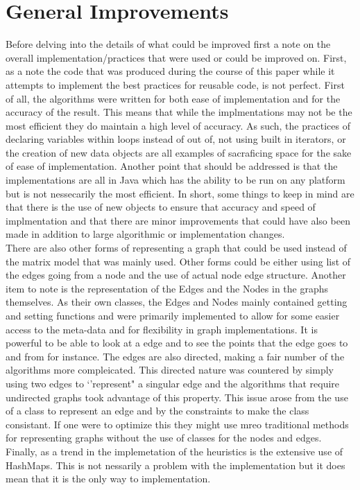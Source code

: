 \documentclass[midd]{thesis}
\newcommand{\tab}{\hspace*{2em}}
\begin{document}
\section{General Improvements}
\tab Before delving into the details of what could be improved first a note on the overall implementation/practices that were used or could be improved on. First, as a note the code that was produced during the course of this paper while it attempts to implement the best practices for reusable code, is not perfect. First of all, the algorithms were written for both ease of implementation and for the accuracy of the result. This means that while the implmentations may not be the most efficient they do maintain a high level of accuracy. As such, the practices of declaring variables within loops instead of out of, not using built in iterators, or the creation of new data objects are all examples of sacraficing space for the sake of ease of implementation. Another point that should be addressed is that the implementations are all in Java which has the ability to be run on any platform but is not nessecarily the most efficient. In short, some things to keep in mind are that there is the use of new objects to ensure that accuracy and speed of implmentation and that there are minor improvements that could have also been made in addition to large algorithmic or implementation changes.\\
\tab There are also other forms of representing a graph that could be used instead of the matrix model that was mainly used. Other forms could be either using list of the edges going from a node and the use of actual node edge structure. Another item to note is the representation of the Edges and the Nodes in the graphs themselves. As their own classes, the Edges and Nodes mainly contained getting and setting functions and were primarily implemented to allow for some easier access to the meta-data and for flexibility in graph implementations. It is powerful to be able to look at a edge and to see the points that the edge goes to and from for instance. The edges are also directed, making a fair number of the algorithms more compleicated. This directed nature was countered by simply using two edges to `'represent" a singular edge and the algorithms that require undirected graphs took advantage of this property. This issue arose from the use of a class to represent an edge and by the constraints to make the class consistant. If one were to optimize this they might use mreo traditional methods for representing graphs without the use of classes for the nodes and edges. Finally, as a trend in the implemetation of the heuristics is the extensive use of HashMaps. This is not nessarily a problem with the implementation but it does mean that it is the only way to implementation.\\
\end{document}
